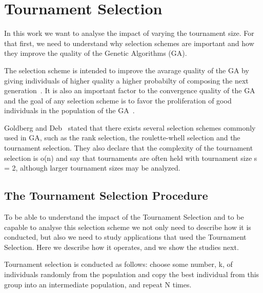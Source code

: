 \section{Tournament Selection}\label{sec:background:Selection Scheme} 

In this work we want to analyse the impact of varying the tournament size. For that first, we need to understand why selection schemes are important and how they improve the quality of the Genetic Algorithms (GA).

The selection scheme is intended to improve the avarage quality of the GA by giving individuals of higher quality a higher probabilty of composing the next generation~\cite{blickle1995mathematical}. It is also an important factor to the convergence quality of the GA and the goal of any selection scheme is to favor the proliferation of good individuals in the population of the GA~\cite{harik1999gambler}. 

Goldberg and Deb~\cite{goldberg1991comparative} stated that there exists several selection schemes commonly used in GA, such as the rank selection, the roulette-whell selection and the tournament selection. They also declare that the complexity of the tournament selection is o(n) and say that tournaments are often held with tournament size s = 2, although larger tournament sizes may be analyzed.

\subsection{The Tournament Selection Procedure}\label{sec:background:tournament_selection} 

To be able to understand the impact of the Tournament Selection and to be capable to analyse this selection scheme we not only need to describe how it is conducted, but also we need to study applications that used the Tournament Selection. Here we describe how it operates, and we show the studies next.

Tournament selection is conducted as follows: choose some number, k, of individuals randomly from the population and copy the best individual from this group into an intermediate population, and repeat N times. 

